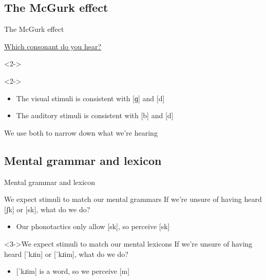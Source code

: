 \documentclass{beamer}
\newcommand{\subonesix}{The McGurk effect}
\newcommand{\suboneseven}{Mental grammar and lexicon}
\begin{document}
    \subsection{\subonesix}
      \begin{frame}{\subonesix}
        \begin{example}
          \href{https://youtu.be/aFPtc8BVdJk}{Which consonant do you hear?}
        \end{example}
        \begin{definition}<2->
           \parencite{mcgurk_hearing_1976}
        \end{definition}
        \begin{block}<2->{}
          \begin{itemize}
            \item The visual stimuli is consistent with [ɡ] and [d]
            \item The auditory stimuli is consistent with [b] and [d]
          \end{itemize}
          We use both to narrow down what we're hearing
        \end{block}
      \end{frame}

    \subsection{\suboneseven}
      \begin{frame}{\suboneseven}
        \begin{block}{We expect stimuli to match our mental grammars}
          If we're unsure of having heard [ʃk] or [sk], what do we do?
          \begin{itemize}
            \item<2-> Our phonotactics only allow [sk], so perceive [sk]
          \end{itemize}
        \end{block}
        \begin{block}<3->{We expect stimuli to match our mental lexicons}
          If we're unsure of having heard [ˈkɹin] or [ˈkɹim], what do we do?
          \begin{itemize}
            \item<4-> {[}ˈkɹim] is a word, so we perceive [m]
          \end{itemize}
        \end{block}
      \end{frame}
\end{document}
